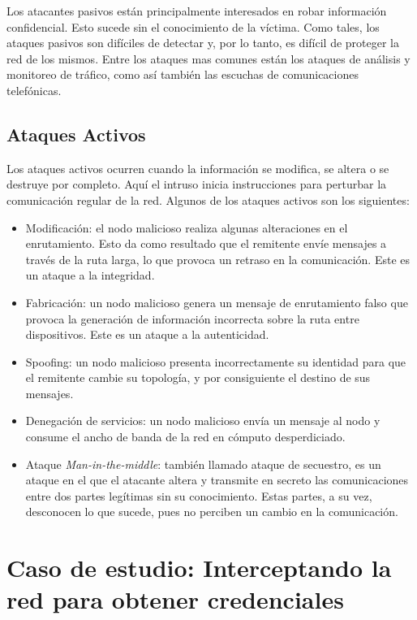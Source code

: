 Los atacantes pasivos están principalmente interesados en robar información 
confidencial. Esto sucede sin el conocimiento de la víctima. Como tales, 
los ataques pasivos son difíciles de detectar y, por lo tanto, es difícil de
proteger la red de los mismos. Entre los ataques mas comunes están los 
ataques de análisis y monitoreo de tráfico, como así también las 
escuchas de comunicaciones telefónicas.

\subsection{Ataques Activos}
Los ataques activos ocurren cuando la información se modifica, se altera o 
se destruye por completo. Aquí el intruso inicia instrucciones para 
perturbar la comunicación regular de la red. Algunos de los ataques 
activos son los  siguientes:
\begin{itemize}
    \setlength\itemsep{-0.6em}
    \item Modificación: el nodo malicioso realiza algunas alteraciones en el
    enrutamiento. Esto da como resultado que el remitente envíe mensajes a 
    través de la ruta larga, lo que provoca un retraso en la comunicación. 
    Este es un ataque a la integridad.
    \item Fabricación: un nodo malicioso genera un mensaje de enrutamiento 
    falso que provoca la generación de información incorrecta sobre la ruta 
    entre dispositivos. Este es un ataque a la autenticidad.
    \item Spoofing: un nodo malicioso presenta incorrectamente su identidad 
    para que el remitente cambie su topología, y por consiguiente el 
    destino de sus mensajes.
    \item Denegación de servicios: un nodo malicioso envía un mensaje al 
    nodo y consume el ancho de banda de la red en cómputo desperdiciado.
    \item Ataque \emph{Man-in-the-middle}: también llamado ataque de secuestro, 
    es un ataque en el que el atacante altera y transmite en secreto 
    las comunicaciones entre dos partes legítimas sin su conocimiento. 
    Estas partes, a su vez, desconocen lo que sucede, pues no perciben 
    un cambio en la comunicación.
\end{itemize}


\section{Caso de estudio: Interceptando la red para obtener credenciales}
\label{secCaseOfStudy}


